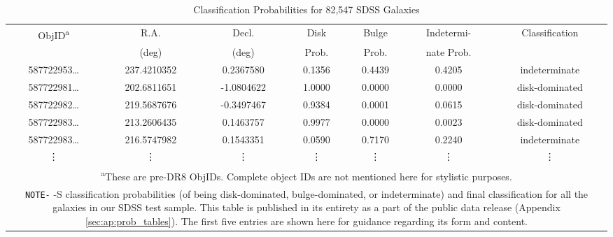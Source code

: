 \begin{table}[htbp]
  \centering
  \caption{Classification Probabilities for 82,547 SDSS Galaxies}
  \label{tab:lt_sdss}
  \begin{tabular}{ccccccc}
  \hline
  \hline
  ObjID\textsuperscript{a} & R.A. & Decl. & Disk & Bulge & Indetermi- & Classification \\
   & (deg) & (deg) & Prob. & Prob. & nate Prob.& \\ 
  \hline
  587722953\ldots & 237.4210352 & 0.2367580 & 0.1356 & 0.4439 & 0.4205 & indeterminate \\
  587722981\ldots & 202.6811651 & -1.0804622 & 1.0000 & 0.0000 & 0.0000 & disk-dominated\\
  587722982\ldots & 219.5687676 & -0.3497467 & 0.9384 & 0.0001 & 0.0615 & disk-dominated\\
  587722983\ldots & 213.2606435 & 0.1463757 & 0.9977 & 0.0000 & 0.0023 & disk-dominated\\
  587722983\ldots & 216.5747982 & 0.1543351 & 0.0590 & 0.7170 & 0.2240 & indeterminate\\
  \vdots & \vdots &\vdots &\vdots &\vdots &\vdots &\vdots\\
  \hline
  \multicolumn{7}{p{0.92\textwidth}}{\vskip 0.01cm \small \textsuperscript{a}These are pre-DR8 ObjIDs. Complete object IDs are not mentioned here for stylistic purposes.} \\
  \multicolumn{7}{p{0.92\textwidth}}{\small \texttt{NOTE-} \gamornet{}-S classification probabilities (of being disk-dominated, bulge-dominated, or indeterminate) and final classification for all the galaxies in our SDSS test sample. This table is published in its entirety as a part of the public data release (Appendix \ref{sec:ap:prob_tables}). The first five entries are shown here for guidance regarding its form and content.}
  \end{tabular}
  \end{table}

